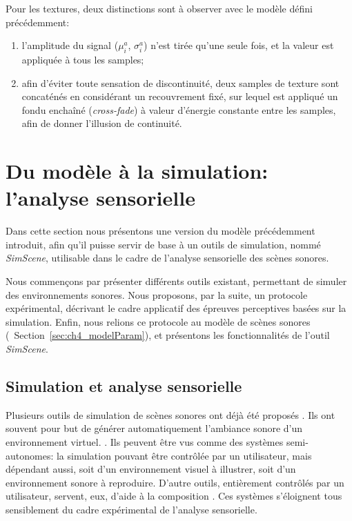 Pour les textures, deux distinctions sont à observer avec le modèle défini précédemment: 

\begin{enumerate}
\item l'amplitude du signal ($\mu^a_i$,  $\sigma^a_i$) n'est tirée qu'une seule fois, et la valeur est appliquée à tous les samples;
\item afin d'éviter toute sensation de discontinuité, deux samples de texture sont concaténés en considérant un recouvrement fixé, sur lequel est appliqué un fondu enchaîné (\emph{cross-fade}) à valeur d'énergie constante entre les samples, afin de donner l'illusion de continuité.
\end{enumerate}


\section{Du modèle à la simulation: l'analyse sensorielle}
\label{sec:ch4_modAnaSo}

Dans cette section nous présentons une version du modèle précédemment introduit, afin qu'il puisse servir de base à un outils de simulation, nommé \emph{SimScene}, utilisable dans le cadre de l'analyse sensorielle des scènes sonores.

Nous commençons par présenter différents outils existant, permettant de simuler des environnements sonores. Nous proposons, par la suite, un protocole expérimental, décrivant le cadre applicatif des épreuves perceptives basées sur la simulation. Enfin, nous relions ce protocole au modèle de scènes sonores (\cf~Section~\ref{sec:ch4_modelParam}), et présentons les fonctionnalités de l'outil \emph{SimScene}.

\subsection{Simulation et analyse sensorielle}

Plusieurs outils de simulation de scènes sonores ont déjà été proposés \citep{misra2006new,misra2007musical,valle2009framework,finney2010soundscape,schirosa2010system}. Ils ont souvent pour but de générer automatiquement l'ambiance sonore d'un environnement virtuel. \citep{valle2009framework,finney2010soundscape}. Ils peuvent être vus comme des systèmes semi-autonomes: la simulation pouvant être contrôlée par un utilisateur, mais dépendant aussi, soit d'un environnement visuel à illustrer, soit d'un environnement sonore à reproduire. D'autre outils, entièrement contrôlés par un utilisateur, servent, eux, d'aide à la composition \citep{misra2006new,misra2007musical}. Ces systèmes s'éloignent tous sensiblement du cadre expérimental de l'analyse sensorielle.

